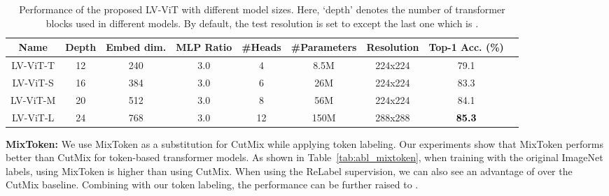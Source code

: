 \documentclass{article}
\newcommand{\highlight}[1]{\textcolor{black}{\textbf{#1}}}
\newcommand{\myPara}[1]{\noindent\textbf{#1:}}
\newcommand{\nameofmethod}{LV-ViT}
\begin{document}
\begin{table}[t]
  \centering
  \small
  \setlength\tabcolsep{1.9mm}
  \renewcommand\arraystretch{1.0}
  \caption{Performance of the proposed \nameofmethod{} with different model sizes. Here, `depth' denotes
  the number of transformer blocks used in different models. By default, the test resolution is set
  to  except the last one which is .}
  \label{tab:model_size}
  \begin{tabular}{ccccccccc} \toprule[0.5pt]
    Name & Depth & Embed dim. & MLP Ratio & \#Heads & \#Parameters & Resolution & Top-1 Acc. (\%) \\ \midrule[0.5pt] \midrule[0.5pt]
    \nameofmethod{}-T & 12 & 240 & 3.0 & 4  & 8.5M & 224x224 & 79.1\\
    \nameofmethod{}-S & 16 & 384 & 3.0 & 6  & 26M  & 224x224 & 83.3\\ 
    \nameofmethod{}-M & 20 & 512 & 3.0 & 8  & 56M  & 224x224 & 84.1\\
    \nameofmethod{}-L & 24 & 768 & 3.0 & 12 & 150M & 288x288 & \highlight{85.3}\\
    \bottomrule[0.5pt]
  \end{tabular}
\end{table}

\myPara{MixToken}
We use MixToken as a substitution for CutMix while applying token labeling.
Our experiments show that MixToken performs better than CutMix for token-based transformer models.
As shown in Table~\ref{tab:abl_mixtoken}, when training with the original ImageNet labels, using MixToken is  higher than using CutMix. 
When using the ReLabel supervision, we can also see an advantage of  over the CutMix baseline.
Combining with our token labeling, the performance can be further raised to .
\end{document}
